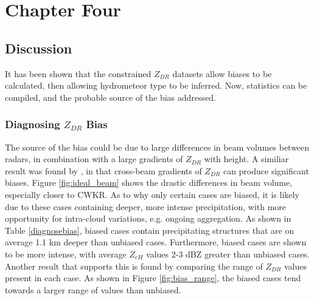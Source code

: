 \chapter{Chapter Four}
\section{Discussion}
It has been shown that the constrained $Z_{DR}$ datasets allow biases to be calculated, then allowing hydrometeor type to be inferred. Now, statistics can be compiled, and the probable source of the bias addressed.
\subsection{Diagnosing $Z_{DR}$ Bias}
The source of the bias could be due to large differences in beam volumes between radars, in combination with a large gradients of $Z_{DR}$ with height. A similiar result was found by \citep{Ryzhkov2007}, in that cross-beam gradients of $Z_{DR}$ can produce significant biases. Figure \ref{fig:ideal_beam} shows the drastic differences in beam volume, especially closer to CWKR. As to why only certain cases are biased, it is likely due to these cases containing deeper, more intense precipitation, with more opportunity for intra-cloud variations, e.g. ongoing aggregation. As shown in Table \ref{diagnosebias}, biased cases contain precipitating structures that are on average 1.1 km deeper than unbiased cases. Furthermore, biased cases are shown to be more intense, with average $Z_{eH}$ values 2-3 dBZ greater than unbiased cases. 
Another result that supports this is found by comparing the range of $Z_{DR}$ values present in each case. As shown in Figure \ref{fig:bias_range}, the biased cases tend towards a larger range of values than unbiased. 
